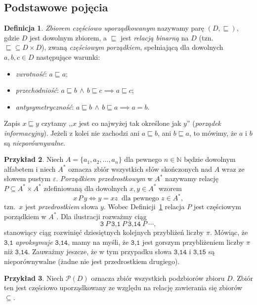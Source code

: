\documentclass[11pt,a4paper]{article}
\theoremstyle{definition}
\newtheorem{definicja}{Definicja}[section]
\newtheorem{przyklad}[definicja]{Przykład}
\theoremstyle{plain}
\begin{document}
\subsection{Podstawowe pojęcia}

\begin{definicja}\label{def:czesciowy_porzadek}
\emph{Zbiorem częściowo uporządkowanym} nazywamy parę $(D,\sqsubseteq)$, gdzie $D$
jest dowolnym zbiorem, a $\sqsubseteq$ jest \emph{relacją binarną} na $D$ (tzn.\
${\sqsubseteq}\subseteq D\times D$), zwaną \emph{częściowym porządkiem}, spełniającą
dla dowolnych $a,b,c\in D$ następujące warunki:
\begin{itemize}
  \item[(1)] \emph{zwrotność}: $a\sqsubseteq a$;
  \item[(2)] \emph{przechodniość}: $a\sqsubseteq b \,\land\, b\sqsubseteq c \implies a\sqsubseteq c$;
  \item[(3)] \emph{antysymetryczność}: $a\sqsubseteq b \,\land\, b\sqsubseteq a \implies a=b$.
\end{itemize}
Zapis $x\sqsubseteq y$ czytamy ,,$x$ jest co najwyżej tak określone jak $y$''
(\emph{porządek informacyjny}). Jeżeli z kolei nie zachodzi ani $a \sqsubseteq b$, ani $b \sqsubseteq a$, to mówimy, że $a$ i $b$ są \emph{nieporównywalne}.
\end{definicja}

\begin{przyklad}\label{prz:alfabet}
Niech $A=\{a_1,a_2,\ldots,a_n\}$ dla pewnego $n\in\mathbb{N}$ będzie dowolnym
alfabetem i niech $A^*$ oznacza zbiór wszystkich słów skończonych nad $A$ wraz ze
słowem pustym $\varepsilon$. \emph{Porządkiem przedrostkowym} w $A^*$ nazywamy
relację $P\subseteq A^*\times A^*$ zdefiniowaną dla dowolnych $x,y\in A^*$ wzorem
\[
	x \, P \, y \iff y = xz \ \text{ dla pewnego } z\in A^*,
\]
tzn.\ $x$ jest \emph{przedrostkiem} słowa $y$. Wobec Definicji~\ref{def:czesciowy_porzadek}
relacja $P$ jest częściowym porządkiem w $A^*$. Dla ilustracji rozważmy ciąg
\[
	\texttt{3} \ P \ \texttt{3,1} \ P \ \texttt{3,14} \ P \ \cdots,
\]
stanowiący ciąg rozwinięć dziesiętnych kolejnych przybliżeń liczby $\pi$. Mówiąc, że
$\texttt{3,1}$ \emph{aproksymuje} $\texttt{3,14}$, mamy na myśli, że $\texttt{3,1}$
jest gorszym przybliżeniem liczby $\pi$ niż $\texttt{3,14}$. Zauważmy jeszcze, że w
tym przypadku słowa $\texttt{3,14}$ i $\texttt{3,15}$ są nieporównywalne (żadne nie
jest przedrostkiem drugiego).
\end{przyklad}

\begin{przyklad}\label{prz:potegowy}
	Niech $\mathcal{P}(D)$ oznacza zbiór wszystkich podzbiorów zbioru $D$. Zbiór ten jest częściowo uporządkowany ze względu na relację zawierania się zbiorów $\subseteq$. 
\end{przyklad}
\end{document}
